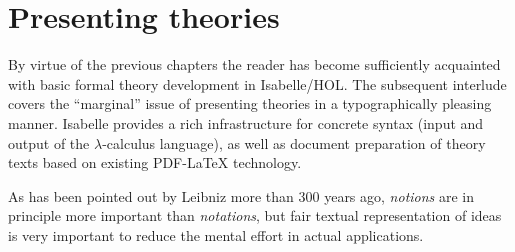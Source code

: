 
\chapter{Presenting theories}
\label{ch:thy-present}

By virtue of the previous chapters the reader has become sufficiently
acquainted with basic formal theory development in Isabelle/HOL.  The
subsequent interlude covers the ``marginal'' issue of presenting theories in a
typographically pleasing manner.  Isabelle provides a rich infrastructure for
concrete syntax (input and output of the $\lambda$-calculus language), as well
as document preparation of theory texts based on existing PDF-{\LaTeX}
technology.

As has been pointed out by Leibniz more than
300 years ago, \emph{notions} are in principle more important than
\emph{notations}, but fair textual representation of ideas is very important
to reduce the mental effort in actual applications.



